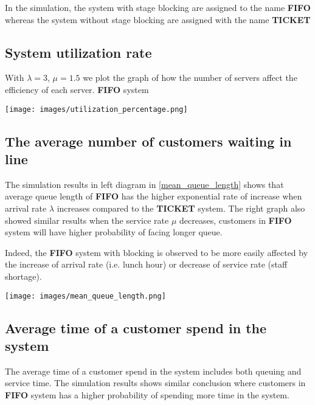 In the simulation, the system with stage blocking are assigned to the name \textbf{FIFO} whereas the system without stage blocking are assigned with the name \textbf{TICKET}
\subsection{System utilization rate}
With $\lambda = 3$, $\mu = 1.5$ we plot the graph of how the number of servers affect the efficiency of each server. \textbf{FIFO} system 

\noindent
\begin{minipage}{\textwidth}
    \texttt{[image: images/utilization\_percentage.png]}
    \label{utilization_percentage}
\end{minipage}

\subsection{The average number of customers waiting in line}

The simulation results in left diagram in \ref{mean_queue_length} shows that average queue length of \textbf{FIFO} has the higher exponential rate of increase when arrival rate $\lambda$ increases compared to the \textbf{TICKET} system. The right graph also showed similar results when the service rate $\mu$ decreases, customers in \textbf{FIFO} system will have higher probability of facing longer queue. 

Indeed, the \textbf{FIFO} system with blocking is observed to be more easily affected by the increase of arrival rate (i.e. lunch hour) or decrease of service rate (staff shortage).

\noindent
\begin{minipage}{\textwidth}
    \texttt{[image: images/mean\_queue\_length.png]}
    \label{mean_queue_length}
\end{minipage}



\subsection{Average time of a customer spend in the system}

The average time of a customer spend in the system includes both queuing and service time. The simulation results shows similar conclusion where customers in  \textbf{FIFO} system has a higher probability of spending more time in the system.

